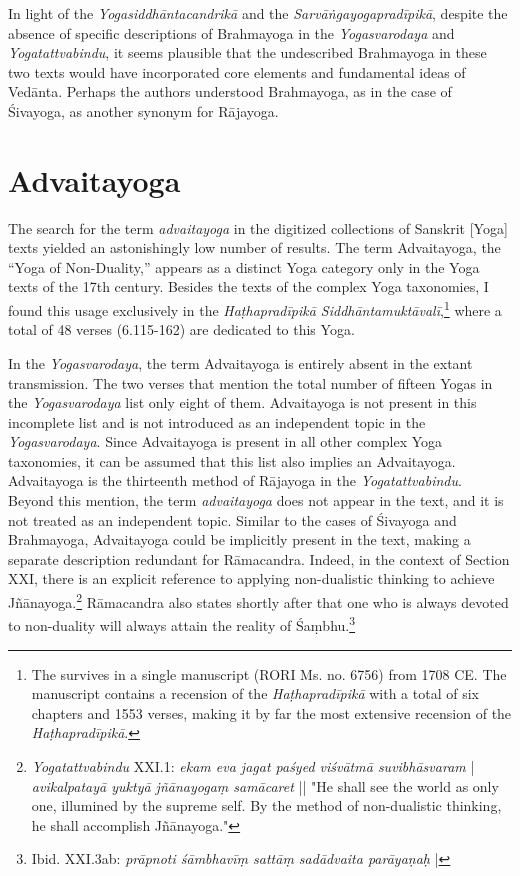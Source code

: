 In light of the \emph{Yogasiddhāntacandrikā} and the \emph{Sarvāṅgayogapradīpikā}, despite the absence of specific descriptions of Brahmayoga in the \emph{Yogasvarodaya} and \emph{Yogatattvabindu}, it seems plausible that the undescribed Brahmayoga in these two texts would have incorporated core elements and fundamental ideas of Vedānta. Perhaps the authors understood Brahmayoga, as in the case of Śivayoga, as another synonym for Rājayoga.

\section{Advaitayoga}
\label{advaitayogaintro}

The search for the term \textit{advaitayoga} in the digitized collections of Sanskrit [Yoga] texts yielded an astonishingly low number of results. The term Advaitayoga, the ``Yoga of Non-Duality,'' appears as a distinct Yoga category only in the Yoga texts of the 17th century. Besides the texts of the complex Yoga taxonomies, I found this usage exclusively in the \emph{Haṭhapradīpikā Siddhāntamuktāvalī},\footnote{The  survives in a single manuscript (RORI Ms. no. 6756) from 1708 CE. The manuscript contains a recension of the \emph{Haṭhapradīpikā} with a total of six chapters and 1553 verses, making it by far the most extensive recension of the \emph{Haṭhapradīpikā}.} where a total of 48 verses (6.115-162) are dedicated to this Yoga.

In the \textit{Yogasvarodaya}, the term Advaitayoga is entirely absent in the extant transmission. The two verses that mention the total number of fifteen Yogas in the \textit{Yogasvarodaya} list only eight of them. Advaitayoga is not present in this incomplete list and is not introduced as an independent topic in the \textit{Yogasvarodaya}. Since Advaitayoga is present in all other complex Yoga taxonomies, it can be assumed that this list also implies an Advaitayoga.
Advaitayoga is the thirteenth method of Rājayoga in the \textit{Yogatattvabindu}. Beyond this mention, the term \textit{advaitayoga} does not appear in the text, and it is not treated as an independent topic. Similar to the cases of Śivayoga and Brahmayoga, Advaitayoga could be implicitly present in the text, making a separate description redundant for Rāmacandra. Indeed, in the context of Section XXI, there is an explicit reference to applying non-dualistic thinking to achieve Jñānayoga.\footnote{\textit{Yogatattvabindu} XXI.1: \textit{ekam eva jagat paśyed viśvātmā suvibhāsvaram} | \textit{avikalpatayā yuktyā jñānayogaṃ samācaret} || "He shall see the world as only one, illumined by the supreme self. By the method of non-dualistic thinking, he shall accomplish Jñānayoga."} Rāmacandra also states shortly after that one who is always devoted to non-duality will always attain the reality of Śaṃbhu.\footnote{Ibid. XXI.3ab: \textit{prāpnoti śāmbhavīṃ sattāṃ sadādvaita parāyaṇaḥ} |}


